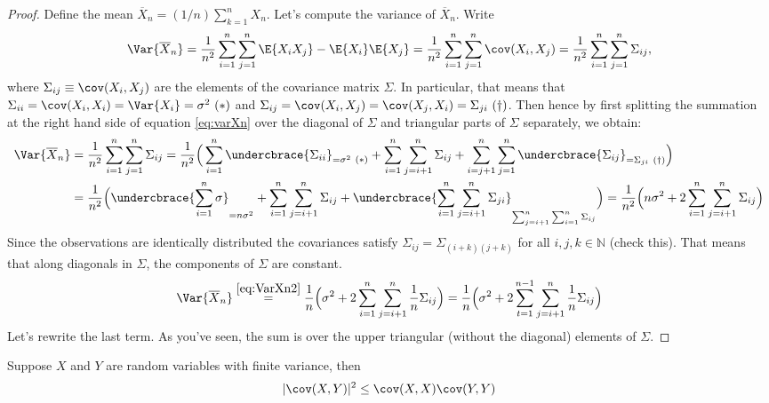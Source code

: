 \documentclass[11pt,english,a4paper]{article}
\begin{document}
\begin{proof}
Define the mean $\overline X_n = (1/n)\sum_{k=1}^n X_n$. Let's compute the variance of $\overline X_n$. Write
\begin{equation}
\Var{\overline X_n} = \frac{1}{n^2} \sum_{i=1}^n\sum_{j=1}^n \E{X_iX_j} - \E{X_i}\E{X_j} = \frac{1}{n^2} \sum_{i=1}^n\sum_{j=1}^n \cov (X_i,X_j) = \frac{1}{n^2} \sum_{i=1}^n\sum_{j=1}^n \Sigma_{ij}, \label{eq:varXn}
\end{equation}
where $\Sigma_{ij} \equiv \cov (X_i,X_j)$ are the elements of the covariance matrix $\Sigma$. In particular, that means that $\Sigma_{ii} = \cov (X_i,X_i) = \Var{X_i} = \sigma^2 \ (*)$ and $\Sigma_{ij} = \cov (X_i,X_j) = \cov (X_j,X_i) = \Sigma_{ji} \ (\dagger)$. Then hence by first splitting the summation at the right hand side of equation \eqref{eq:varXn} over the diagonal of $\Sigma$ and triangular parts of $\Sigma$ separately, we obtain:
\begin{align}
\Var{\overline X_n} &= \frac{1}{n^2}\sum_{i=1}^n\sum_{j=1}^n \Sigma_{ij} = \frac{1}{n^2} \Big( \sum_{i = 1}^n \undercbrace{\Sigma_{ii}}_{= \sigma^2 \ (*)} +  \sum_{i=1}^n\sum_{j=i+1}^n \Sigma_{ij} + \sum_{i=j+1}^n\sum_{j=1}^n \undercbrace{\Sigma_{ij} }_{=  \Sigma_{ji} \ (\dagger) } \Big) \nonumber \\
&= \frac{1}{n^2} \Big( \undercbrace{\sum_{i=1}^n \sigma}_{=n\sigma^2} + \sum_{i=1}^n\sum_{j= i+1}^n \Sigma_{ij} + \undercbrace{\sum_{i=1}^n\sum_{j= i+1}^n \Sigma_{ji} }_{\sum_{j= i+1}^n\sum_{i=1}^n \Sigma_{ij}} \Big) = \frac{1}{n^2} \Big( n \sigma^2 + 2\sum_{i=1}^n\sum_{j= i+1}^n \Sigma_{ij} \Big) \label{eq:VarXn2}
\end{align}
Since the observations are identically distributed the covariances satisfy $\Sigma_{ij} = \Sigma_{(i+k)(j+k)}$ for all $i,j,k \in \mathbb{N}$ (check this). That means that along diagonals in $\Sigma$, the components of $\Sigma$ are constant.
\[
\Var{ \overline X_n } \stackrel{ \eqref{eq:VarXn2} }{=} \frac{1}{n} \Big( \sigma^2 + 2\sum_{i=1}^n\sum_{j= i+1}^n \frac{1}{n}\Sigma_{ij} \Big) = \frac{1}{n} \Big( \sigma^2 + 2\sum_{t=1}^{n-1}\sum_{j= i+1}^n \frac{1}{n}\Sigma_{ij} \Big)
\]
 Let's rewrite the last term. As you've seen, the sum is over the upper triangular (without the diagonal) elements of $\Sigma$. 
\end{proof}
\begin{lemma*}
Suppose $X$ and $Y$ are random variables with finite variance, then
\[
| \cov (X,Y) |^2 \leq \cov (X,X) \cov (Y,Y)
\]
\label{lemma:inequality}
\end{lemma*}
\end{document}
